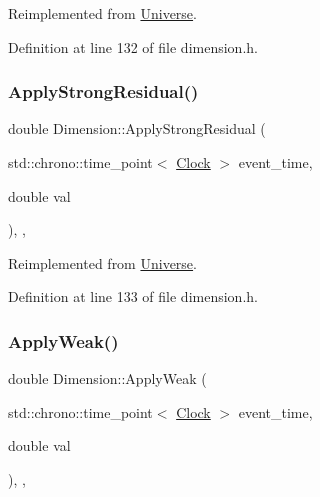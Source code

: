 Reimplemented from \mbox{\hyperlink{class_universe_a62789bcff84bd750b0366004381e2fdd}{Universe}}.



Definition at line 132 of file dimension.\+h.

\mbox{\label{class_dimension_a2ae0b6a8ee17f6e28b6d2d3209df4bf4}} 
\subsubsection{\texorpdfstring{Apply\+Strong\+Residual()}{ApplyStrongResidual()}}
{\footnotesize\ttfamily double Dimension\+::\+Apply\+Strong\+Residual (\begin{DoxyParamCaption}\item[{std\+::chrono\+::time\+\_\+point$<$ \mbox{\hyperlink{universe_8h_a0ef8d951d1ca5ab3cfaf7ab4c7a6fd80}{Clock}} $>$}]{event\+\_\+time,  }\item[{double}]{val }\end{DoxyParamCaption})\hspace{0.3cm}{\ttfamily [inline]}, {\ttfamily [final]}, {\ttfamily [virtual]}}



Reimplemented from \mbox{\hyperlink{class_universe_af7becebb347be9a85541d96a3eca1ca7}{Universe}}.



Definition at line 133 of file dimension.\+h.

\mbox{\label{class_dimension_a72b8ab8d676b4df6b9a6ef948f5693c9}} 
\subsubsection{\texorpdfstring{Apply\+Weak()}{ApplyWeak()}}
{\footnotesize\ttfamily double Dimension\+::\+Apply\+Weak (\begin{DoxyParamCaption}\item[{std\+::chrono\+::time\+\_\+point$<$ \mbox{\hyperlink{universe_8h_a0ef8d951d1ca5ab3cfaf7ab4c7a6fd80}{Clock}} $>$}]{event\+\_\+time,  }\item[{double}]{val }\end{DoxyParamCaption})\hspace{0.3cm}{\ttfamily [inline]}, {\ttfamily [final]}, {\ttfamily [virtual]}}



